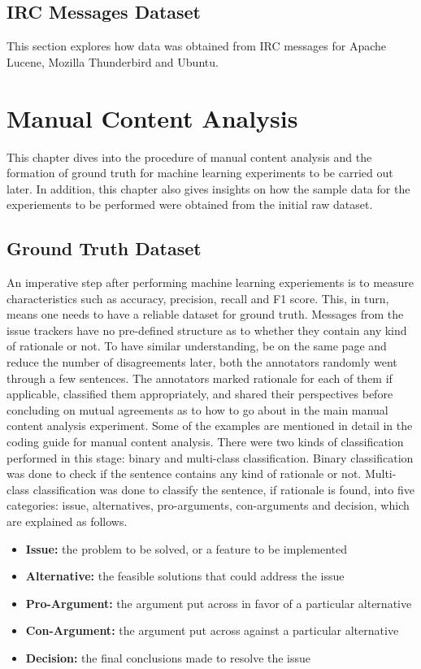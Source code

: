 \documentclass[a4paper,12pt,twoside]{report}
\begin{document}
\section{IRC Messages Dataset}

This section explores how data was obtained from IRC messages for Apache Lucene, Mozilla Thunderbird and Ubuntu. 


\chapter{Manual Content Analysis}

This chapter dives into the procedure of manual content analysis and the formation of ground truth for machine learning experiments to be carried out later. In addition, this chapter also gives insights on how the sample data for the experiements to be performed were obtained from the initial raw dataset. 

\section{Ground Truth Dataset}
An imperative step after performing machine learning experiements is to measure characteristics such as accuracy, precision, recall and F1 score. This, in turn, means one needs to have a reliable dataset for ground truth. Messages from the issue trackers have no pre-defined structure as to whether they contain any kind of rationale or not. To have similar understanding, be on the same page and reduce the number of disagreements later, both the annotators randomly went through a few sentences. The annotators marked rationale for each of them if applicable, classified them appropriately, and shared their perspectives before concluding on mutual agreements as to how to go about in the main manual content analysis experiment.  Some of the examples are mentioned in detail in the coding guide for manual content analysis. There were two kinds of classification performed in this stage: binary and multi-class classification. Binary classification was done to check if the sentence contains any kind of rationale or not. Multi-class classification was done to classify the sentence, if rationale is found, into five categories: issue, alternatives, pro-arguments, con-arguments and decision, which are explained as follows.

\begin{itemize}
\item \textbf{Issue:} the problem to be solved, or a feature to be implemented
\item \textbf{Alternative:} the feasible solutions that could address the issue
\item \textbf{Pro-Argument:} the argument put across in favor of a particular alternative
\item \textbf{Con-Argument:} the argument put across against a particular alternative
\item \textbf{Decision:} the final conclusions made to resolve the issue
\end{itemize}
\end{document}
